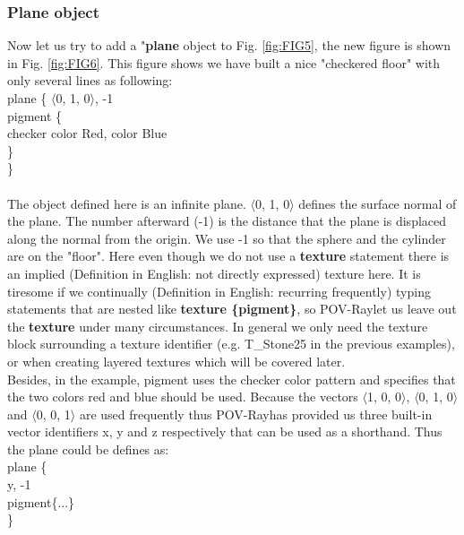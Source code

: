 \documentclass[fleqn,10pt]{wlscirep}
\newcommand*{\PV}{POV-Ray}
\newcommand*{\DF}{Definition in English}
\begin{document}
\subsubsection{Plane object}
Now let us try to add a "\textbf{plane} object to Fig. \ref{fig:FIG5}, the new figure is shown in Fig. \ref{fig:FIG6}. This figure shows we have built a nice "checkered floor" with only several lines as following:\\
\textcolor[rgb]{0.2,0.1,1}
{
plane \{ $\langle$0, 1, 0$\rangle$, -1\\
pigment \{  \\
checker color Red, color Blue  \\
\}  \\
\}  \\
} \\
\newline
The object defined here is an infinite plane. $\langle$0, 1, 0$\rangle$ defines the surface normal of the plane. The number afterward (-1) is the distance that the plane is displaced along the normal from the origin. We use -1 so that the sphere and the cylinder are on the "floor". Here even though we do not use a \textbf{texture} statement there is an implied (\DF: not directly expressed) texture here. It is tiresome if we continually (\DF: recurring frequently) typing statements that are nested like \textbf{texture \{pigment\}}, so \PV let us leave out the \textbf{texture} under many circumstances. In general we only need the texture block surrounding a texture identifier (e.g. T\_Stone25 in the previous examples), or when creating layered textures which will be covered later. \\
\newline
Besides, in the example, pigment uses the checker color pattern and specifies that the two colors red and blue should be used. Because the vectors $\langle$1, 0, 0$\rangle$, $\langle$0, 1, 0$\rangle$ and $\langle$0, 0, 1$\rangle$ are used frequently thus \PV has provided us three built-in vector identifiers x, y and z respectively that can be used as a shorthand. Thus the plane could be defines as:\\
\textcolor[rgb]{0.2,0.1,1}
{
plane \{ \\
y, -1  \\
pigment\{...\}  \\
\}  \\
}
\end{document}
